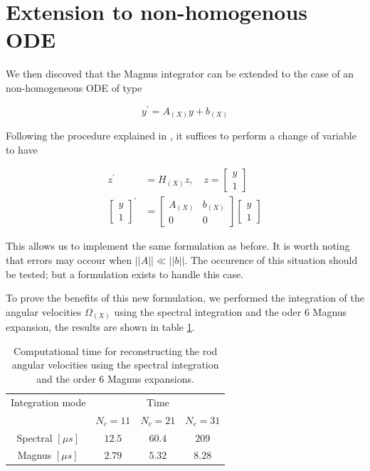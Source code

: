 \documentclass[12pt,a4paper]{article}
\begin{document}
\section{Extension to non-homogenous ODE}


We then discoved that the Magnus integrator can be extended to the case of an non-homogeneous ODE of type

\begin{equation}
	y^\prime = A_{(X)} y + b_{(X)}
\end{equation}

Following the procedure explained in \cite{blanes2012time}, it suffices to perform a change of variable to have 

\begin{equation}
\begin{aligned}
	z^\prime &= H_{(X)} z, \quad
	z = 
	\begin{bmatrix}
		y	\\
		1
	\end{bmatrix}	\\	
	\begin{bmatrix}
		y	\\
		1
	\end{bmatrix}^\prime &=
	\begin{bmatrix}
		A_{(X)}	&	b_{(X)}	\\
			0	&	0
	\end{bmatrix}
	\begin{bmatrix}
		y	\\
		1
	\end{bmatrix}
\end{aligned}
\end{equation}

This allows us to implement the same formulation as before. It is worth noting that errors may occour when $\vert \vert A \vert \vert  \ll   \vert \vert b \vert \vert$. The occurence of this situation should be tested; but a formulation exists to handle this case.


To prove the benefits of this new formulation, we performed the integration of the angular velocities $\Omega_{(X)}$ using the spectral integration and the oder 6 Magnus expansion, the results are shown in table \ref{computational time omega}.



\begin{table}[!ht]
	\begin{tabular}{c|c|c|c}
		Integration mode &	\multicolumn{3}{c}{Time} \\
		&	$N_c = 11$	&	$N_c = 21$	&	$N_c = 31 $	\\
		\hline
		Spectral $[\mu s]$&	$12.5$	& $60.4$	&	$209$ \\
		Magnus $[\mu s]$&	$2.79$	& $5.32$	&	$8.28$ 
	\end{tabular}
	\caption{Computational time for reconstructing the rod angular velocities using the spectral integration and the order 6 Magnus expansions.} \label{computational time omega}
\end{table}
\end{document}
